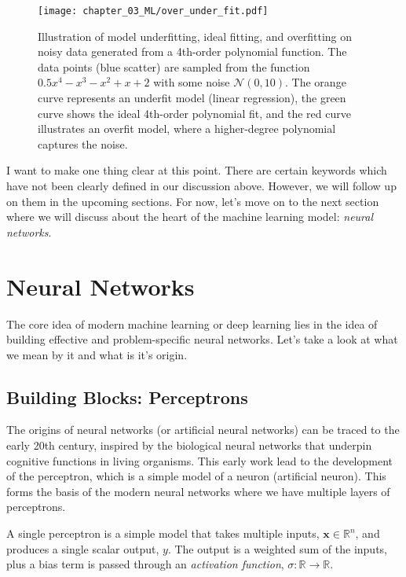 \begin{figure}[t]
    \centering
    \texttt{[image: chapter\_03\_ML/over\_under\_fit.pdf]}
    \caption{Illustration of model underfitting, ideal fitting, and overfitting on noisy data generated from a 4th-order polynomial function. The data points (blue scatter) are sampled from the function $0.5x^4 - x^3 - x^2 + x + 2$ with some noise $\mathcal{N}(0, 10)$. The orange curve represents an underfit model (linear regression), the green curve shows the ideal 4th-order polynomial fit, and the red curve illustrates an overfit model, where a higher-degree polynomial captures the noise.}
    \label{fig:overfitting_underfitting}
\end{figure}

I want to make one thing clear at this point. There are certain keywords which have not been clearly defined in our discussion above. However, we will follow up on them in the upcoming sections. For now, let's move on to the next section where we will discuss about the heart of the machine learning model: \textit{neural networks}.

\section{Neural Networks}

The core idea of modern machine learning or deep learning lies in the idea of building effective and problem-specific neural networks. Let's take a look at what we mean by it and what is it's origin.

\subsection{Building Blocks: Perceptrons}

The origins of neural networks (or artificial neural networks) can be traced to the early 20th century, inspired by the biological neural networks that underpin cognitive functions in living organisms. This early work lead to the development of the perceptron, which is a simple model of a neuron (artificial neuron). This forms the basis of the modern neural networks where we have multiple layers of perceptrons.

A single perceptron is a simple model that takes multiple inputs, $\textbf{x} \in \mathbb{R}^n$, and produces a single scalar output, $y$. The output is a weighted sum of the inputs, plus a bias term is passed through an \textit{activation function}, $\sigma: \mathbb{R} \rightarrow \mathbb{R}$.

